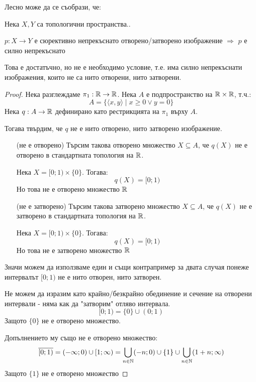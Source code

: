 Лесно може да се съобрази, че:
\begin{proposition}
    Нека $X, Y$ са топологични пространства..

    $p: X \to Y$ е сюрективно непрекъснато отворено/затворено изображение $\Rightarrow$ $p$ е силно непрекъснато
\end{proposition}
\begin{remark}
    Това е достатъчно, но не е необходимо условие, т.е. има силно непрекъснати изображения, които не са нито отворени, нито затворени.
\end{remark}
\begin{proof}
    Нека разглеждаме $\pi_1: {\mathbb{R}} \to {\mathbb{R}}$. Нека $A$ е подпространство на ${\mathbb{R}} \times {\mathbb{R}}$, т.ч.:
    \begin{equation}
        A = \{\langle x, y \rangle \mid x \geq 0 \lor y=0\}
    \end{equation}
    Нека $q : A \to {\mathbb{R}}$ дефинирано като рестрикцията на $\pi_1$ върху $A$.

    Тогава твърдим, че $q$ не е нито отворено, нито затворено изображение.

    \begin{itemize}
        \item[(не е отворено)] Търсим такова отворено множество $X \subseteq A$, че $q(X)$ не е отворено в стандартната топология на ${\mathbb{R}}$.
        
        Нека $X = [0; 1) \times \{0\}$. Тогава:
        \begin{equation}
            q(X) = [0; 1)
        \end{equation}
        Но това не е отворено множество ${\mathbb{R}}$

        \item[(не е затворено)] Търсим такова затворено множество $X \subseteq A$, че $q(X)$ не е затворено в стандартната топология на ${\mathbb{R}}$.
        
        Нека $X = [0; 1) \times \{0\}$. Тогава:
        \begin{equation}
            q(X) = [0; 1)
        \end{equation}
        Но това не е затворено множество ${\mathbb{R}}$
    \end{itemize}
    Значи можем да използваме един и същи контрапример за двата случая понеже интервалът $[0; 1)$ не е нито отворен, нито затворен.

    Не можем да изразим като крайно/безкрайно обединение и сечение на отворени интервали - няма как да "затворим" отляво интервала.
    \begin{equation}
        [0; 1) = \{0\} \cup (0; 1)
    \end{equation}
    Защото $\{0\}$ не е отворено множество.

    Допълнението му също не е отворено множество:
    \begin{equation}
        \overline{[0; 1)} = (-\infty; 0) \cup [1; \infty) = \bigcup_{n \in {\mathbb{N}}} (-n;0) \cup \{1\} \cup \bigcup_{n\in{\mathbb{N}}} (1+n;\infty)
    \end{equation}
    Защото $\{1\}$ не е отворено множество
\end{proof}

